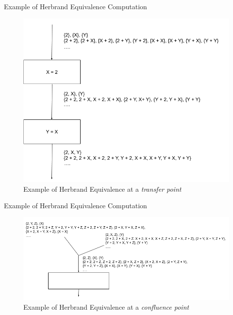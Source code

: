 \documentclass[11pt]{beamer}
\begin{document}
\begin{frame}{Example of Herbrand Equivalence Computation}
    \begin{figure}[!h]
        \centering
        \includegraphics[scale=0.3]{HerbrandEquivalenceTrans.png}
        \caption{Example of Herbrand Equivalence at a \textit{transfer point}}
        \label{fig:HerbrandEquivalenceTrans}
    \end{figure}
\end{frame}

\begin{frame}{Example of Herbrand Equivalence Computation}
    \begin{figure}[!h]
        \centering
        \includegraphics[scale=0.4]{HerbrandEquivalenceConv.png}
        \caption{Example of Herbrand Equivalence at a \textit{confluence point}}
        \label{fig:HerbrandEquivalenceConv}
    \end{figure}
\end{frame}
\end{document}
